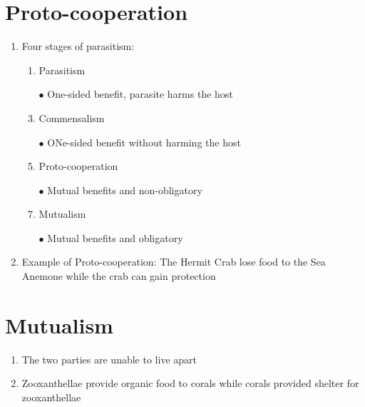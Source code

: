 \documentclass{report}
\begin{document}
\section{Proto-cooperation}
\begin{enumerate}
    \item Four stages of parasitism:
    \begin{enumerate}
        \item Parasitism
        \item [$\bullet$]One-sided benefit, parasite harms the host 
        \item Commensalism
        \item [$\bullet$]ONe-sided benefit without harming the host 
        \item Proto-cooperation
        \item [$\bullet$]Mutual benefits and non-obligatory
        \item Mutualism
        \item [$\bullet$]Mutual benefits and obligatory
    \end{enumerate}
    \item Example of Proto-cooperation: The Hermit Crab lose food to the Sea Anemone while the crab can gain protection
\end{enumerate}


\section{Mutualism}
\begin{enumerate}
    \item The two parties are unable to live apart
    \item Zooxanthellae provide organic food to corals while corals provided shelter for zooxanthellae
\end{enumerate}
\end{document}
